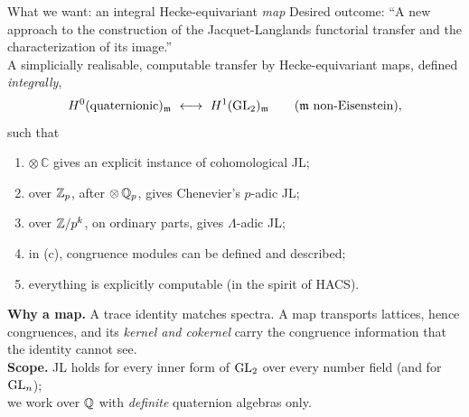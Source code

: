 \begin{frame}{What we want: an integral Hecke-equivariant \emph{map}}
  \small
  {\footnotesize Desired outcome: ``A new approach to the construction of the Jacquet-Langlands functorial transfer and the characterization of its image.''}\\[2pt]
  A simplicially realisable, computable transfer by Hecke-equivariant maps, defined \emph{integrally},
  \[H^0(\text{quaternionic})_\m\ \longleftrightarrow\ H^1(\GL_2)_\m\qquad(\m\ \text{non-Eisenstein}),\]
  such that
  \begin{enumerate}\setlength{\itemsep}{0pt}
    \item[(a)] $\otimes\,\mathbb C$ gives an explicit instance of cohomological JL;
    \item[(b)] over $\mathbb{Z}_p$, after $\otimes\,\mathbb{Q}_p$, gives Chenevier's $p$-adic JL;
    \item[(c)] over $\mathbb{Z}/p^k$, on ordinary parts, gives $\Lambda$-adic JL;
    \item[(d)] in (c), congruence modules can be defined and described;
    \item[(e)] everything is explicitly computable (in the spirit of HACS).
  \end{enumerate}
  \textbf{Why a map.} A trace identity matches spectra. A map transports lattices, hence congruences, and its \emph{kernel and
  cokernel} carry the congruence information that the identity cannot see.\\[3pt]
  \textbf{Scope.} JL holds for every inner form of $\mathrm{GL}_2$ over every number field (and for $\mathrm{GL}_n$);\\
  we work over $\mathbb{Q}$ with
  \emph{definite} quaternion algebras only.
\end{frame}
